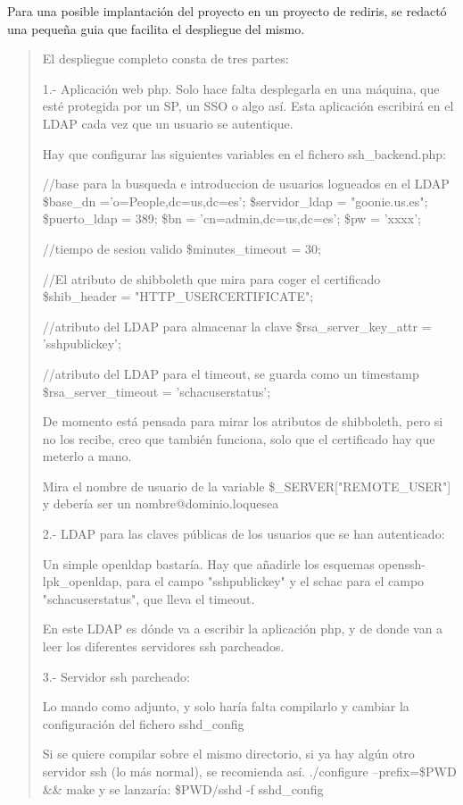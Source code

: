     Para una posible implantación del proyecto en un proyecto de rediris,
    se redactó una pequeña guia que facilita el despliegue del mismo.

    \begin{quote}
El despliegue completo consta de tres partes:

1.- Aplicación web php. Solo hace falta desplegarla en una máquina, que
esté protegida por un SP, un SSO o algo así. Esta aplicación escribirá
en el LDAP cada vez que un usuario se autentique.

Hay que configurar las siguientes variables en el fichero
ssh\_backend.php:

//base para la busqueda e introduccion de usuarios logueados en el LDAP
\$base\_dn ='o=People,dc=us,dc=es';
\$servidor\_ldap = "goonie.us.es";
\$puerto\_ldap = 389;
\$bn = 'cn=admin,dc=us,dc=es';
\$pw = 'xxxx';

//tiempo de sesion valido
\$minutes\_timeout = 30;

//El atributo de shibboleth que mira para coger el certificado
\$shib\_header = "HTTP\_USERCERTIFICATE";

//atributo del LDAP para almacenar la clave
\$rsa\_server\_key\_attr = 'sshpublickey';

//atributo del LDAP para el timeout, se guarda como un timestamp
\$rsa\_server\_timeout = 'schacuserstatus';

De momento está pensada para mirar los atributos de shibboleth, pero si
no los recibe, creo que también funciona, solo que el certificado hay
que meterlo a mano.

Mira el nombre de usuario de la variable \$\_SERVER["REMOTE\_USER"] y
debería ser un nombre@dominio.loquesea

2.- LDAP para las claves públicas de los usuarios que se han
autenticado:

Un simple openldap bastaría. Hay que añadirle los esquemas
openssh-lpk\_openldap, para el campo "sshpublickey" y el schac para el
campo "schacuserstatus", que lleva el timeout.

En este LDAP es dónde va a escribir la aplicación php, y de donde van a
leer los diferentes servidores ssh parcheados.

3.- Servidor ssh parcheado:

Lo mando como adjunto, y solo haría falta compilarlo y cambiar la
configuración del fichero sshd\_config

Si se quiere compilar sobre el mismo directorio, si ya hay algún otro
servidor ssh (lo más normal), se recomienda así.
./configure --prefix=\$PWD \&\& make
y se lanzaría:
\$PWD/sshd -f sshd\_config


\end{quote}
